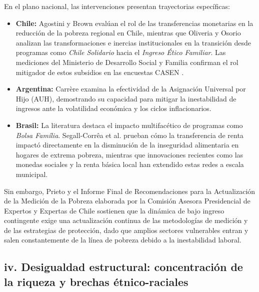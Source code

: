 En el plano nacional, las intervenciones presentan trayectorias específicas:
\begin{itemize}
\item \textbf{Chile:} Agostini y Brown \parencite*{AgostiniBrown2011} evalúan el rol de las transferencias monetarias en la reducción de la pobreza regional en Chile, mientras que Oliveria y Osorio \parencite*{OliveiraOsorioGonner2022} analizan las transformaciones e inercias institucionales en la transición desde programas como \textit{Chile Solidario} hacia el \textit{Ingreso Ético Familiar}. Las mediciones del Ministerio de Desarrollo Social y Familia confirman el rol mitigador de estos subsidios en las encuestas CASEN \parencite{ResumenResultadosCASEN2023,TensoresBienestarSocial2024}.
\item \textbf{Argentina:} Carrère \parencite*{Carrere2026} examina la efectividad de la Asignación Universal por Hijo (AUH), demostrando su capacidad para mitigar la inestabilidad de ingresos ante la volatilidad económica y los ciclos inflacionarios.
\item \textbf{Brasil:} La literatura destaca el impacto multifacético de programas como \textit{Bolsa Família}. Segall-Corrêa et al. \parencite*{Segall-Correaetal2008} prueban cómo la transferencia de renta impactó directamente en la disminución de la inseguridad alimentaria en hogares de extrema pobreza, mientras que innovaciones recientes como las monedas sociales y la renta básica local \parencite{OrnellasMauriel2025} han extendido estas redes a escala municipal.
\end{itemize}

Sin embargo, Prieto \parencite*{Prieto2024} y el Informe Final de Recomendaciones para la Actualización de la Medición de la Pobreza elaborada por la Comisión Asesora Presidencial de Expertos y Expertas de Chile \parencite*{InformeFinalRecomendaciones2025} sostienen que la dinámica de bajo ingreso contingente exige una actualización continua de las metodologías de medición y de las estrategias de protección, dado que amplios sectores vulnerables entran y salen constantemente de la línea de pobreza debido a la inestabilidad laboral.

\subsection{iv. Desigualdad estructural: concentración de la riqueza y brechas étnico-raciales}

